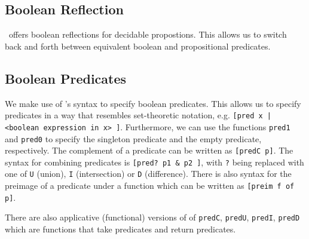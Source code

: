 \subsection{Boolean Reflection}
\ssreflect\ offers boolean reflections for decidable propostions. 
This allows us to switch back and forth between equivalent boolean and propositional predicates.

\subsection{Boolean Predicates}
We make use of \ssreflect's syntax to specify boolean predicates.
This allows us to specify predicates in a way that resembles set-theoretic notation, e.g. 
\lstinline{[pred x | <boolean expression in x> ]}.
Furthermore, we can use the functions \lstinline{pred1} and \lstinline{pred0} to specify the singleton predicate and the empty predicate, respectively.
The complement of a predicate can be written as \lstinline{[predC p]}. 
The syntax for combining predicates is \lstinline{[pred? p1 & p2 ]}, with \lstinline{?} being replaced with one of 
\lstinline{U} (union), \lstinline{I} (intersection) or \lstinline{D} (difference).
There is also syntax for the preimage of a predicate under a function
which can be written as \lstinline{[preim f of p]}.



There are also applicative (functional) versions of of \lstinline{predC}, \lstinline{predU}, \lstinline{predI}, \lstinline{predD} which are functions that take predicates and return predicates.

